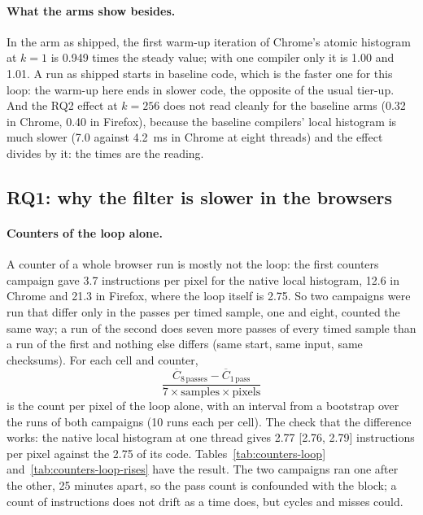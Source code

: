 \paragraph{What the arms show besides.} In the arm as shipped, the first
warm-up iteration of Chrome's atomic histogram at $k=1$ is 0.949 times the
steady value; with one compiler only it is 1.00 and 1.01. A run as shipped
starts in baseline code, which is the faster one for this loop: the warm-up
here ends in slower code, the opposite of the usual tier-up. And the RQ2
effect at $k=256$ does not read cleanly for the baseline arms (0.32 in
Chrome, 0.40 in Firefox), because the baseline compilers' local histogram
is much slower (7.0 against 4.2~ms in Chrome at eight threads) and the
effect divides by it: the times are the reading.

\subsection{RQ1: why the filter is slower in the browsers}
\label{sec:why-rq1}

\paragraph{Counters of the loop alone.} A counter of a whole browser run is
mostly not the loop: the first counters campaign gave 3.7 instructions per
pixel for the native local histogram, 12.6 in Chrome and 21.3 in Firefox,
where the loop itself is 2.75. So two campaigns were run that differ only
in the passes per timed sample, one and eight, counted the same way; a run
of the second does seven more passes of every timed sample than a run of
the first and nothing else differs (same start, same input, same checksums).
For each cell and counter,
\[
\frac{\overline{C}_{8\,\mathrm{passes}} - \overline{C}_{1\,\mathrm{pass}}}{7 \times \mathrm{samples} \times \mathrm{pixels}}
\]
is the count per pixel of the loop alone, with an interval from a bootstrap
over the runs of both campaigns (10 runs each per cell). The check that the
difference works: the native local histogram at one thread gives 2.77
[2.76, 2.79] instructions per pixel against the 2.75 of its code.
Tables~\ref{tab:counters-loop} and~\ref{tab:counters-loop-rises} have
the result. The two campaigns ran one
after the other, 25 minutes apart, so the pass count is confounded with the
block; a count of instructions does not drift as a time does, but cycles
and misses could.




